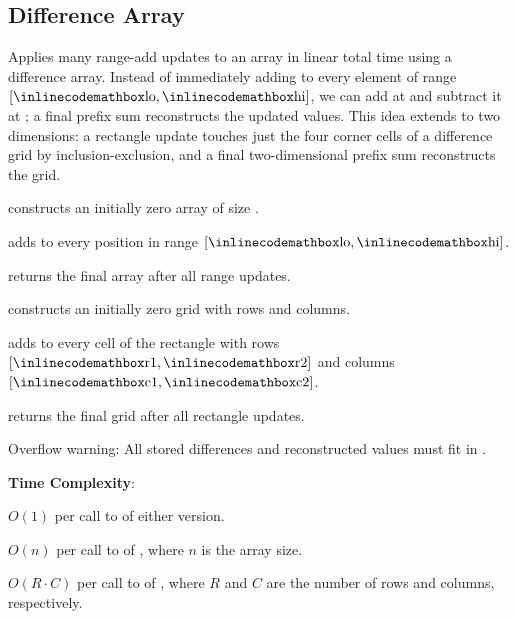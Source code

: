 \subsection{Difference Array}
\label{sec:1.2.2}
Applies many range-add updates to an array in linear total time using a difference array. Instead of immediately adding  to every element of range $[{\inlinecodemath{lo}}, {\inlinecodemath{hi}}]$, we can add  at  and subtract it at ; a final prefix sum reconstructs the updated values. This idea extends to two dimensions: a rectangle update touches just the four corner cells of a difference grid by inclusion-exclusion, and a final two-dimensional prefix sum reconstructs the grid.

\begin{compactitem}
  \item {} constructs an initially zero array of size .
  \item {} adds  to every position in range $[{\inlinecodemath{lo}}, {\inlinecodemath{hi}}]$.
  \item {} returns the final array after all range updates.
  \item {} constructs an initially zero grid with  rows and  columns.
  \item {} adds  to every cell of the rectangle with rows $[{\inlinecodemath{r1}}, {\inlinecodemath{r2}}]$ and columns $[{\inlinecodemath{c1}}, {\inlinecodemath{c2}}]$.
  \item {} returns the final grid after all rectangle updates.
\end{compactitem}

Overflow warning: All stored differences and reconstructed values must fit in .

\textbf{Time Complexity}:
\begin{compactitem}
  \item $O(1)$ per call to  of either version.
  \item $O(n)$ per call to  of , where $n$ is the array size.
  \item $O(R \cdot C)$ per call to  of , where $R$ and $C$ are the number of rows and columns, respectively.
\end{compactitem}

